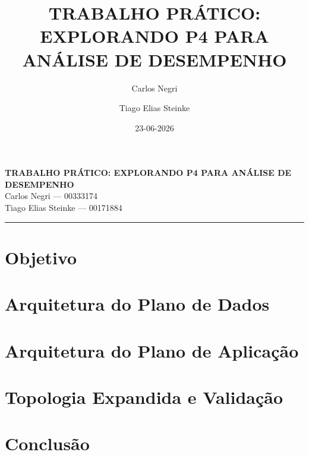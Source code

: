 \documentclass[a4paper,12pt]{article}
\title{TRABALHO PRÁTICO: EXPLORANDO P4 PARA ANÁLISE DE DESEMPENHO}
\author{Carlos Negri \and Tiago Elias Steinke}
\date{23-06-2026}
\begin{document}
\begin{center}
    {\Large \textbf{TRABALHO PRÁTICO: EXPLORANDO P4 PARA ANÁLISE DE DESEMPENHO}}\\
    \vspace{0.2cm}
    Carlos Negri --- 00333174 \\
    Tiago Elias Steinke --- 00171884 \\
\end{center}

\noindent\rule{\textwidth}{0.4pt}

\vspace{0.5cm}

\section{Objetivo}


\section{Arquitetura do Plano de Dados}


\section{Arquitetura do Plano de Aplicação}


\section{Topologia Expandida e Validação}


\section{Conclusão}

\end{document}
